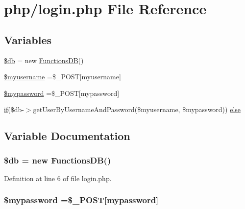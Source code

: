 \hypertarget{php_2login_8php}{}\section{php/login.php File Reference}
\label{php_2login_8php}
\subsection*{Variables}
\begin{DoxyCompactItemize}
\item 
\hyperlink{php_2login_8php_a1fa3127fc82f96b1436d871ef02be319}{\$db} = new \hyperlink{class_functions_d_b}{Functions\+D\+B}()
\item 
\hyperlink{php_2login_8php_a5dacfe932d81e07fdb90fc80dbf5a03f}{\$myusername} =\$\+\_\+\+P\+O\+S\+T\mbox{[}\textquotesingle{}myusername\textquotesingle{}\mbox{]}
\item 
\hyperlink{php_2login_8php_a8a8ddd334c184fadadf1a10b53126c95}{\$mypassword} =\$\+\_\+\+P\+O\+S\+T\mbox{[}\textquotesingle{}mypassword\textquotesingle{}\mbox{]}
\item 
\hyperlink{php_2login__success_8php_a417be69c2182c77301b6d9d54792e7e5}{if}(\$db-\/$>$get\+User\+By\+Username\+And\+Password(\$myusername, \$mypassword)) \hyperlink{php_2login_8php_a6986c10ba08e74cdfb9f3ac3a66f9af9}{else}
\end{DoxyCompactItemize}


\subsection{Variable Documentation}
\hypertarget{php_2login_8php_a1fa3127fc82f96b1436d871ef02be319}{}
\subsubsection[{\$db}]{\setlength{\rightskip}{0pt plus 5cm}\$db = new {\bf Functions\+D\+B}()}\label{php_2login_8php_a1fa3127fc82f96b1436d871ef02be319}


Definition at line 6 of file login.\+php.

\hypertarget{php_2login_8php_a8a8ddd334c184fadadf1a10b53126c95}{}
\subsubsection[{\$mypassword}]{\setlength{\rightskip}{0pt plus 5cm}\$mypassword =\$\+\_\+\+P\+O\+S\+T\mbox{[}\textquotesingle{}mypassword\textquotesingle{}\mbox{]}}\label{php_2login_8php_a8a8ddd334c184fadadf1a10b53126c95}


